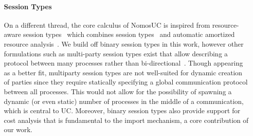 \paragraph*{\textbf{Session Types}}
On a different thread, the core calculus of NomosUC is inspired from resource-aware session types~\cite{das2018work} which combines
session types~\cite{HondaCONCUR1993, HondaESOP1998, HondaPOPL2008,caires2010session, ToninhoESOP2013, PfenningFOSSACS2015,
WadlerICFP2012} and automatic amortized resource analysis~\cite{Hofmann03AARA,HoffmannW15}.
We build off binary session types in this work, however other formulations such as multi-party session types exist that allow describing a protocol between many processes rather than bi-directional~\cite{Capecchi10CONCUR}.
Though appearing as a better fit, multiparty session types are not well-suited for dynamic creation of parties since they require statically specifying a global communication protocol between all processes.
This would not allow for the possibility of spawning a dynamic (or even static) number of processes in the middle of a communication, which is central to UC.
Moreover, binary session types also provide support for cost analysis that is fundamental to the import mechanism, a core contribution of our work.



